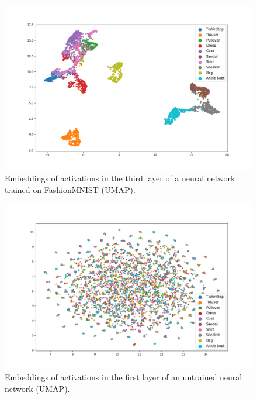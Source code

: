 \documentclass{article}
\begin{document}
\begin{figure}
  \centering
    \includegraphics[width=1.0\textwidth]{../../out/activations_cnn/fmnist/umap/trained/plot_l3.png}
    \caption{Embeddings of activations in the third layer of a neural network trained on FashionMNIST (UMAP).}
\end{figure}

\begin{figure}
  \centering
    \includegraphics[width=1.0\textwidth]{../../out/activations_cnn/fmnist/umap/untrained/plot_l1_f0.png}
    \caption{Embeddings of activations in the first layer of an untrained neural network (UMAP).}
\end{figure}
\end{document}
